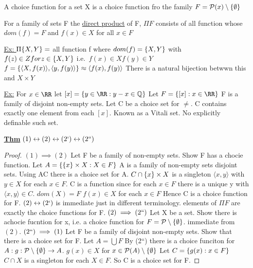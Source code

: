 \dfn A choice function for a set X is a choice function fro the family $F = \mathcal{P}(x) \setminus\{\emptyset\}$

\dfn For a family of sets F the \underline{direct product} of F, $\Pi F$ consists of all function whose $dom(f) = F$ and $f(x) \in X$ for all $x \in F$

\underline{Ex: } $\Pi \{X, Y\} = $ all function f where $dom(f) = \{X,Y\}$ with $f(z) \in Z for z \in \{X,Y\}$
i.e.\ $f(x) \in X f(y) \in Y$
$f = \{\langle X, f(x) \rangle,\langle y, f(y) \rangle\} \approx \langle f(x), f(y) \rangle$
There is a natural bijection betwwn this and $X \times Y$


\underline{Ex:} For $x \in \RR$ let $[x] = \set{y \in \RR : y-x \in \mathbb{Q}}$
Let $F = \set{[x] : x \in \RR}$
F is a family of disjoint non-empty sets.
Let C be a choice set for $\neq$.
C contains exactly one element from each $[x]$.
Known as a Vitali set.
No explicitly definable such set.

\textbf{\underline{Thm}} $(1) \leftrightarrow (2) \leftrightarrow (2`) \leftrightarrow (2``)$
\begin{proof}
$(1) \implies (2)$ Let F be a family of non-empty sets.
    Show F has a chocie function.
    Let $A = \{\{x\} \times X : X \in F\}$
    A is a family of non-empty sets disjoint sets.
    Using AC there is a choice set for A.
    $C \cap \{x\}\times X$ is a singleton $\langle x, y \rangle$ with $y \in X$ for each $x \in F$.
    C is a function since for each $x \in F$ there is a unique y with $\langle x, y \rangle \in C$.
    $dom(X) = F$
    $f(x) \in X$ for each $x \in F$
    Hence C is a choice function for F.
$(2) \leftrightarrow (2`)$ is immediate just in different terminology.
    elements of $\Pi F$ are exactly the choice functions for F.
$(2) \implies (2``)$ Let X be a set.
    Show there is achocie fucntion for x, i.e. a choice function for $F = \mathcal{P} \setminus \{\emptyset\}$.
    immediate from $(2)$.
$(2``) \implies (1)$ Let F be a family of disjoint non-empty sets.
    Show that there is a choice set for F.
    Let $A = \bigcup F$
    By (2``) there is a choice funciton for $A: g : \mathcal{P}\setminus \{\emptyset\} \rightarrow A$.
    $g(x) \in X$ for $x \in \mathcal{P}(A)\setminus \{\emptyset\}$
    Let $C = \{g(x) : x \in F\}$
    $C \cap X$ is a singleton for each $X \in F$.
    So C is a choice set for F.
\end{proof}

